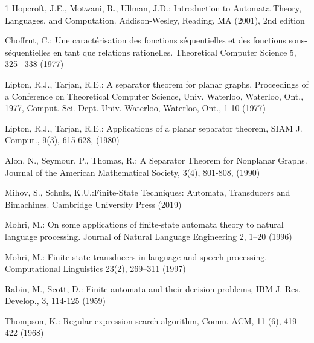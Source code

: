 
\begin{thebibliography}{1}
 		Hopcroft, J.E., Motwani, R., Ullman, J.D.: Introduction to Automata
		Theory, Languages, and Computation. Addison-Wesley, Reading, MA
		(2001), 2nd edition

		Choffrut, C.: Une caract\'erisation des fonctions s\'equentielles et
		des fonctions sous-s\'equentielles en tant que relations rationelles.
		Theoretical Computer Science 5, 325– 338 (1977)

		Lipton, R.J., Tarjan, R.E.: A separator theorem for planar graphs,
		Proceedings of a Conference on Theoretical Computer Science, Univ.
		Waterloo, Waterloo, Ont., 1977, Comput. Sci. Dept. Univ. Waterloo,
		Waterloo, Ont., 1-10 (1977)

		Lipton, R.J., Tarjan, R.E.: Applications of a planar separator
		theorem, SIAM J. Comput., 9(3), 615-628, (1980)

		Alon, N., Seymour, P., Thomas, R.: A Separator Theorem for Nonplanar
		Graphs. Journal of the American Mathematical Society, 3(4), 801-808,
		(1990)

		Mihov, S., Schulz, K.U.:Finite-State Techniques: Automata,
		Transducers and Bimachines. Cambridge University Press (2019)

		Mohri, M.: On some applications of finite-state automata theory to
		natural language processing. Journal of Natural Language Engineering
		2, 1–20 (1996)

		Mohri, M.: Finite-state transducers in language and speech
		processing. Computational Linguistics 23(2), 269–311 (1997)

		Rabin, M., Scott, D.: Finite automata and their decision problems,
		IBM J. Res. Develop., 3, 114-125 (1959)

		Thompson, K.: Regular expression search algorithm, Comm. ACM, 11
		(6), 419-422 (1968)
\end{thebibliography}
